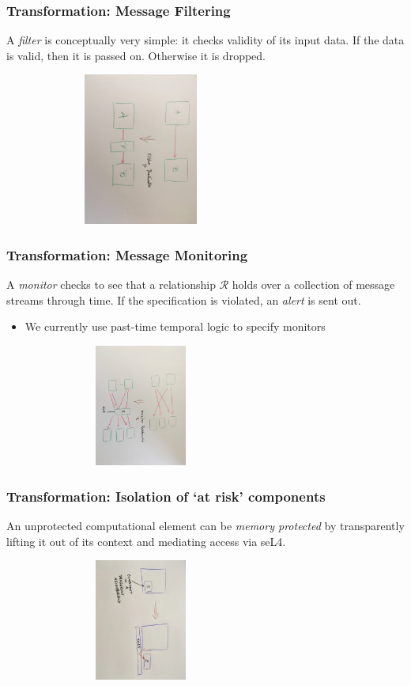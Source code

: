 \documentclass{beamer}
\begin{document}
\begin{frame}\frametitle{Transformation: Message Filtering}

A \emph{filter} is conceptually very simple: it checks validity of its input data.
If the data is valid, then it is passed on. Otherwise it is dropped.

\hspace*{10mm}\includegraphics[width=90mm,height=50mm]{filter.jpg}

\end{frame}


\begin{frame}\frametitle{Transformation: Message Monitoring}

A \emph{monitor} checks to see that a relationship $\mathcal{R}$ holds
over a collection of message streams through time. If the
specification is violated, an \emph{alert} is sent out.

\begin{itemize}
  \item We currently use past-time temporal logic to specify monitors
\end{itemize}

\hspace*{10mm}\includegraphics[width=90mm,height=40mm]{monitor.jpg}

\end{frame}


\begin{frame}\frametitle{Transformation: Isolation of `at risk' components}

An unprotected computational element can be \emph{memory protected} by
transparently lifting it out of its context and mediating access via seL4.

\hspace*{10mm}\includegraphics[width=90mm,height=40mm]{vm.jpg}

\end{frame}
\end{document}

